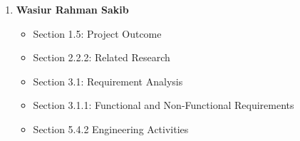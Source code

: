 \documentclass[a4paper,11pt]{report}
\begin{document}
\begin{enumerate}
\item\textbf{Wasiur Rahman Sakib}
\begin{itemize}
\item Section 1.5: Project Outcome
\item Section 2.2.2: Related Research
\item Section 3.1: Requirement Analysis
\item Section 3.1.1: Functional and Non-Functional Requirements
\item Section 5.4.2 Engineering Activities
\end{itemize}
\end{enumerate}
\end{document}
